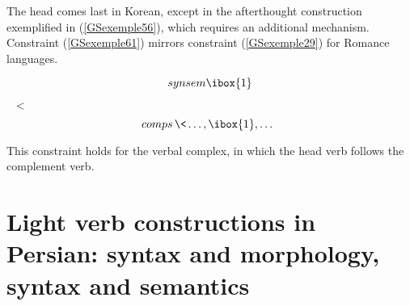 {%
%
%


The head comes last in Korean, except in the afterthought construction exemplified in (\ref{GSexemple56}), which requires an additional mechanism. Constraint (\ref{GSexemple61}) mirrors constraint (\ref{GSexemple29}) for Romance languages.

\ea
\label{GSexemple61}
    \begin{avm}
		\[synsem \ibox{1}\]~ <  \[comps\, \<\ldots{}, \ibox{1}, \ldots{}\>\,\]
	\end{avm}
\z

This constraint holds for the verbal complex, in which the head verb follows the complement verb.



\section{Light verb constructions in Persian: syntax and morphology, syntax and semantics}\label{GSsection5}

}
